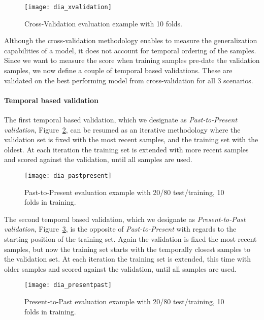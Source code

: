\begin{figure}[!h]
	\centering
	\texttt{[image: dia\_xvalidation]}
	\caption{Cross-Validation evaluation example with 10 folds.}
	\label{fig:dia_xvalidation}
\end{figure}

Although the cross-validation methodology enables to measure the generalization capabilities of a model, it does not account for temporal ordering of the samples. Since we want to measure the score when training samples pre-date the validation samples, we now define a couple of temporal based validations. These are validated on the best performing model from cross-validation for all 3 scenarios.

\paragraph{Temporal based validation}
The first temporal based validation, which we designate as \textit{Past-to-Present validation}, Figure~\ref{fig:dia_pastpresent}, can be resumed as an iterative methodology where the validation set is fixed with the most recent samples, and the training set with the oldest. At each iteration the training set is extended with more recent samples and scored against the validation, until all samples are used.

\begin{figure}[!h]
	\centering
	\texttt{[image: dia\_pastpresent]}
	\caption{Past-to-Present evaluation example with 20/80 test/training, 10 folds in training.}
	\label{fig:dia_pastpresent}
\end{figure}


The second temporal based validation, which we designate as \textit{Present-to-Past validation}, Figure~\ref{fig:dia_presentpast}, is the opposite of \textit{Past-to-Present} with regards to the starting position of the training set. Again the validation is fixed the most recent samples, but now the training set starts with the temporally closest samples to the validation set. At each iteration the training set is extended, this time with older samples and scored against the validation, until all samples are used.

\begin{figure}[!h]
	\centering
	\texttt{[image: dia\_presentpast]}
	\caption{Present-to-Past evaluation example with 20/80 test/training, 10 folds in training.}
	\label{fig:dia_presentpast}
\end{figure}

